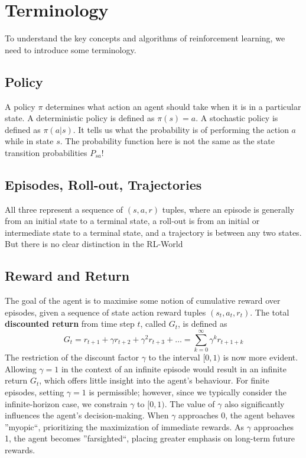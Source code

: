 \section{Terminology}
To understand the key concepts and algorithms of reinforcement learning,
we need to introduce some terminology.

\subsection{Policy}
A policy $\pi$ determines what action an agent should take when it is in a 
particular state. A deterministic policy is defined as $\pi(s) = a$. A stochastic 
policy is defined as $\pi(a|s)$. It tells us what the probability 
is of performing the action $a$ while in state $s$. The probability function here 
is not the same as the state transition probabilities $P_{sa}$!

\subsection{Episodes, Roll-out, Trajectories}
All three represent a sequence of $(s, a, r)$ tuples, where an episode is 
generally from an initial state to a terminal state, a roll-out is from an initial 
or intermediate state to a terminal state, and a trajectory is between any two 
states. But there is no clear distinction in the RL-World  


\subsection{Reward and Return}
The goal of the agent is to maximise some notion of cumulative reward over episodes, given a sequence of 
state action reward tuples $(s_t, a_t, r_t)$. The total \textbf{discounted return} from time step $t$, called $G_t$, is defined as 
\begin{equation*}
    G_t = r_{t+1}+ \gamma r_{t+2} + \gamma^{2} r_{t+3} + \dots = \sum_{k=0}^{\infty} \gamma^{k} r_{t+1+k}
\end{equation*}
The restriction of the discount factor $\gamma$ to the interval $[0, 1)$ is now more evident. Allowing $\gamma = 
1$ in the context of an infinite episode would result in an infinite return $G_t$, which offers little insight 
into the agent's behaviour. For finite episodes, setting $\gamma = 1$ is permissible; however, since we typically
consider the infinite-horizon case, we constrain $\gamma$ to $[0, 1)$. The value of $\gamma$ also significantly 
influences the agent's decision-making. When $\gamma$ approaches 0, the agent behaves ''myopic``, prioritizing 
the maximization of immediate rewards. As $\gamma$ approaches 1, the agent becomes ''farsighted``, placing 
greater emphasis on long-term future rewards.

